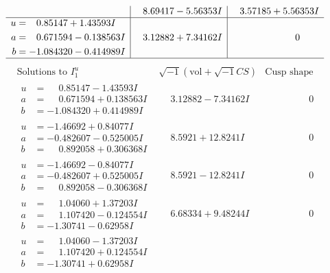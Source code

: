\documentclass[1p]{elsarticle_modified}
\theoremstyle{definition}
\newcommand{\I}{\sqrt{-1}}
\begin{document}
$$\begin{array}{c|c|c}
 & \phantom{-}8.69417 - 5.56353 I & \phantom{-}3.57185 + 5.56353 I \\ \hline\begin{aligned}
u &= \phantom{-}0.85147 + 1.43593 I \\
a &= \phantom{-}0.671594 - 0.138563 I \\
b &= -1.084320 - 0.414989 I\end{aligned}
 & \phantom{-}3.12882 + 7.34162 I & \phantom{-0.000000 } 0\\
 \hline 
 \end{array}$$\newpage$$\begin{array}{c|c|c}  
\text{Solutions to }I^u_{1}& \I (\text{vol} + \sqrt{-1}CS) & \text{Cusp shape}\\
 \hline 
\begin{aligned}
u &= \phantom{-}0.85147 - 1.43593 I \\
a &= \phantom{-}0.671594 + 0.138563 I \\
b &= -1.084320 + 0.414989 I\end{aligned}
 & \phantom{-}3.12882 - 7.34162 I & \phantom{-0.000000 } 0 \\ \hline\begin{aligned}
u &= -1.46692 + 0.84077 I \\
a &= -0.482607 - 0.525005 I \\
b &= \phantom{-}0.892058 + 0.306368 I\end{aligned}
 & \phantom{-}8.5921 + 12.8241 I & \phantom{-0.000000 } 0 \\ \hline\begin{aligned}
u &= -1.46692 - 0.84077 I \\
a &= -0.482607 + 0.525005 I \\
b &= \phantom{-}0.892058 - 0.306368 I\end{aligned}
 & \phantom{-}8.5921 - 12.8241 I & \phantom{-0.000000 } 0 \\ \hline\begin{aligned}
u &= \phantom{-}1.04060 + 1.37203 I \\
a &= \phantom{-}1.107420 - 0.124554 I \\
b &= -1.30741 - 0.62958 I\end{aligned}
 & \phantom{-}6.68334 + 9.48244 I & \phantom{-0.000000 } 0 \\ \hline\begin{aligned}
u &= \phantom{-}1.04060 - 1.37203 I \\
a &= \phantom{-}1.107420 + 0.124554 I \\
b &= -1.30741 + 0.62958 I\end{aligned}

\end{array}$$
\end{document}

